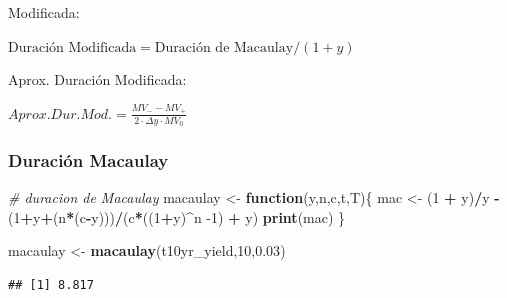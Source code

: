 \documentclass[12pt,]{book}
\newenvironment{Shaded}{\begin{snugshade}}{\end{snugshade}}
\newcommand{\KeywordTok}[1]{\textcolor[rgb]{0.13,0.29,0.53}{\textbf{#1}}}
\newcommand{\DecValTok}[1]{\textcolor[rgb]{0.00,0.00,0.81}{#1}}
\newcommand{\FloatTok}[1]{\textcolor[rgb]{0.00,0.00,0.81}{#1}}
\newcommand{\StringTok}[1]{\textcolor[rgb]{0.31,0.60,0.02}{#1}}
\newcommand{\CommentTok}[1]{\textcolor[rgb]{0.56,0.35,0.01}{\textit{#1}}}
\newcommand{\ControlFlowTok}[1]{\textcolor[rgb]{0.13,0.29,0.53}{\textbf{#1}}}
\newcommand{\OperatorTok}[1]{\textcolor[rgb]{0.81,0.36,0.00}{\textbf{#1}}}
\newcommand{\NormalTok}[1]{#1}
\begin{document}
\vspace{3pt}

Modificada:

\begin{center}

$\text{Duración Modificada} = \text{Duración de Macaulay}/(1+y)$

\end{center}

\vspace{5pt}

Aprox. Duración Modificada:

\begin{center}

$Aprox.Dur.Mod.= \frac{MV_{-}-MV_{+}}{2 \cdot \Delta y \cdot MV_{0}}$

\end{center}

\subsubsection{Duración Macaulay}\label{duracion-macaulay}

\begin{Shaded}
\begin{Highlighting}[]
\CommentTok{# duracion de Macaulay}
\NormalTok{macaulay <-}\StringTok{ }\ControlFlowTok{function}\NormalTok{(y,n,c,t,T)\{}
\NormalTok{         mac <-}\StringTok{ }\NormalTok{(}\DecValTok{1} \OperatorTok{+}\StringTok{ }\NormalTok{y)}\OperatorTok{/}\NormalTok{y }\OperatorTok{-}\StringTok{ }\NormalTok{(}\DecValTok{1}\OperatorTok{+}\NormalTok{y}\OperatorTok{+}\NormalTok{(n}\OperatorTok{*}\NormalTok{(c}\OperatorTok{-}\NormalTok{y)))}\OperatorTok{/}\NormalTok{(c}\OperatorTok{*}\NormalTok{((}\DecValTok{1}\OperatorTok{+}\NormalTok{y)}\OperatorTok{^}\NormalTok{n }\DecValTok{-1}\NormalTok{) }\OperatorTok{+}\StringTok{ }\NormalTok{y)}
         \KeywordTok{print}\NormalTok{(mac)}
\NormalTok{\} }
\end{Highlighting}
\end{Shaded}

\begin{Shaded}
\begin{Highlighting}[]
\NormalTok{macaulay <-}\StringTok{ }\KeywordTok{macaulay}\NormalTok{(t10yr_yield,}\DecValTok{10}\NormalTok{,}\FloatTok{0.03}\NormalTok{)}
\end{Highlighting}
\end{Shaded}

\begin{verbatim}
## [1] 8.817
\end{verbatim}
\end{document}
